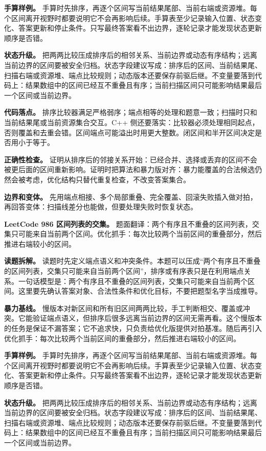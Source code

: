 \textbf{手算样例。} 手算时先排序，再逐个区间写当前结果尾部、当前右端或资源堆。每个区间离开视野时都要说明它不会再影响后续。手算表至少记录输入位置、状态变化、答案更新和停止条件。只写最终答案看不出边界，逐轮记录才能发现状态更新顺序是否错。

\textbf{状态升级。} 把两两比较压成排序后的相邻关系、当前边界或动态有序结构；远离当前边界的区间要被安全归档。状态字段建议写成：排序后的区间、当前结果尾、扫描右端或资源堆、端点比较规则；动态版本还要保存前驱后继。不变量要落到代码上：结果数组中的区间已经互不重叠且有序；当前扫描区间只可能影响结果最后一个区间或当前边界。

\textbf{代码落点。} 排序比较器满足严格弱序；端点相等的处理和题意一致；扫描时只和当前结果尾或当前资源集合交互。C++ 侧还要落实：比较器必须处理相同起点，否则覆盖和去重会错。区间端点可能溢出时用更大整数。闭区间和半开区间决定是否用小于等于。

\textbf{正确性检查。} 证明从排序后的邻接关系开始：已经合并、选择或丢弃的区间不会被更后面的区间重新影响。证明时把算法和暴力版对齐：暴力能覆盖的合法候选仍然会被考虑，优化结构只替代重复检查，不改变答案集合。

\textbf{边界和变体。} 先用端点相接、多个局部重叠、完全覆盖、回滚失败插入做对拍，再回答变体：扫描线差分也能做，但要处理失败时恢复状态。

\noindent\textbf{LeetCode 986 区间列表的交集。} 题面翻译：两个有序且不重叠的区间列表，交集只可能来自当前两个区间。优化抓手：每次比较两个当前区间的重叠部分，然后推进右端较小的区间。

\textbf{读题拆解。} 读题时先定义端点语义和冲突条件。本题可以压成“两个有序且不重叠的区间列表，交集只可能来自当前两个区间”，排序或有序表只是在利用端点关系。一句话模型是：两个有序且不重叠的区间列表，交集只可能来自当前两个区间。这里要先确认答案对象、合法性条件和优化目标，不要把题型名字当成推导。

\textbf{暴力基线。} 慢版本对新区间和所有旧区间两两比较，手工判断相交、覆盖或冲突。它能验证端点语义，但排序后很多远离当前边界的区间无需再看。这个慢版本的任务是保证不漏答案；它不追求快，只负责给优化版提供对拍基准。随后再引入优化抓手：每次比较两个当前区间的重叠部分，然后推进右端较小的区间。

\textbf{手算样例。} 手算时先排序，再逐个区间写当前结果尾部、当前右端或资源堆。每个区间离开视野时都要说明它不会再影响后续。手算表至少记录输入位置、状态变化、答案更新和停止条件。只写最终答案看不出边界，逐轮记录才能发现状态更新顺序是否错。

\textbf{状态升级。} 把两两比较压成排序后的相邻关系、当前边界或动态有序结构；远离当前边界的区间要被安全归档。状态字段建议写成：排序后的区间、当前结果尾、扫描右端或资源堆、端点比较规则；动态版本还要保存前驱后继。不变量要落到代码上：结果数组中的区间已经互不重叠且有序；当前扫描区间只可能影响结果最后一个区间或当前边界。

